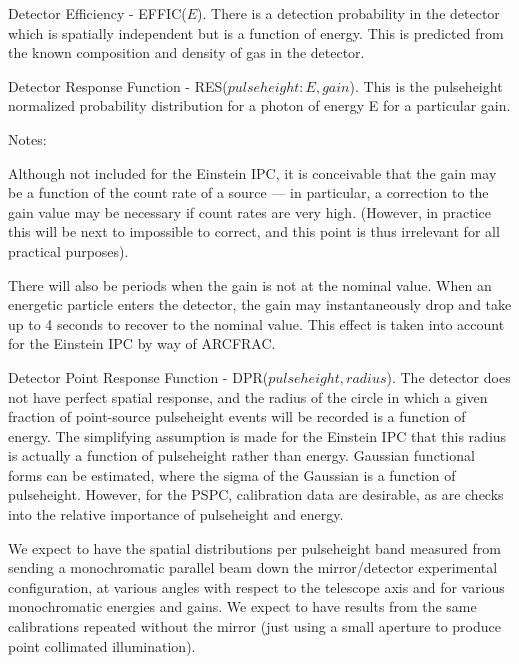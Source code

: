 \@{Detector Efficiency - EFFIC($E$).}
There is a detection probability in the detector which is spatially
independent but is a function of energy.  This is predicted from the
known composition and density of gas in the detector.

\@{Detector Response Function - RES($pulseheight:E,gain$).}
This is the pulseheight normalized probability distribution for a photon
of energy E for a particular gain.

\par\noindent
Notes:

 Although not included for the Einstein IPC, it is conceivable
that the gain may be a function of the count rate of a source ---
in particular, a correction to the gain value may be necessary
if count rates are very high.  (However, in practice this will be next to
impossible to correct, and this point is thus irrelevant for
all practical purposes).

 There will also be periods when the gain is not at the
nominal value.  When an energetic particle enters the detector,
the gain may instantaneously drop and take up to 4 seconds
to recover to the nominal value. This effect is taken into
account for the Einstein IPC by way of ARCFRAC.

\@{Detector Point Response Function - DPR($pulseheight,radius$).}
The detector does not have perfect spatial response, and the
radius of the circle
in which a given fraction of point-source
pulseheight events will be recorded is a function of
energy. The simplifying assumption is made for the Einstein IPC that this 
radius is actually a function of pulseheight rather than energy. Gaussian functional
forms can be estimated, where the sigma of the Gaussian is a function
of pulseheight.  However, for the PSPC, calibration data are desirable, as are
checks into the relative importance of pulseheight and energy.





We expect to have the spatial distributions per pulseheight band
measured from sending a monochromatic parallel beam down the
mirror/detector experimental configuration,
at various angles with respect to the telescope axis
and for various monochromatic energies and gains.  We expect to have
results from the same calibrations repeated without the
mirror (just using a small aperture to produce point collimated
illumination).

